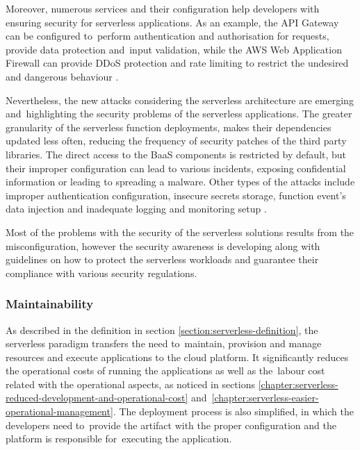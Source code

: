 Moreover, numerous services and their configuration help developers with ensuring security for serverless applications. As an example, the API Gateway can be configured to~perform authentication and authorisation for requests, provide data protection and~input validation, while the AWS Web Application Firewall can provide DDoS protection and rate limiting to restrict the undesired and dangerous behaviour \cite{EvaluationOfServerlessApplicationProgrammingModel}.

Nevertheless, the new attacks considering the serverless architecture are emerging and~highlighting the security problems of the serverless applications. The greater granularity of the serverless function deployments, makes their dependencies updated less often, reducing the frequency of security patches of the third party libraries.
The direct access to the BaaS components is restricted by default, but their improper configuration can lead to various incidents, exposing confidential information or leading to spreading a malware.
Other types of the attacks include improper authentication configuration, insecure secrets storage, function event’s data injection and inadequate logging and monitoring setup \cite{EvaluationOfServerlessApplicationProgrammingModel}.

Most of the problems with the security of the serverless solutions results from the misconfiguration, however the security awareness is developing along with guidelines on how to protect the serverless workloads and guarantee their compliance with various security regulations.

\subsubsection{Maintainability} \label{chapter:serverless-suitability-maintainability}

As described in the definition in section \ref{section:serverless-definition}, the serverless paradigm transfers the need to~maintain, provision and manage resources and execute applications to the cloud platform. It significantly reduces the operational costs of running the applications as well as the~labour cost related with the operational aspects, as noticed in sections \ref{chapter:serverless-reduced-development-and-operational-cost} and~\ref{chapter:serverless-easier-operational-management}. The deployment process is also simplified, in which the developers need to~provide the artifact with the proper configuration and the platform is responsible for~executing the application.

